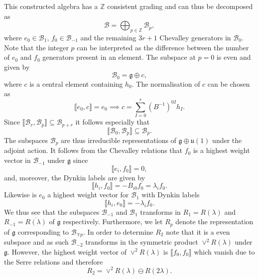 This constructed algebra has a $\mathbb{Z}$ consistent grading and can thus be decomposed as 
\begin{equation}
    \mathscr{B} = \bigoplus_{p\in\mathbb{Z}} \mathscr{B}_p,
\end{equation}
where $e_0\in\mathscr{B}_{1}$, $f_0\in\mathscr{B}_{-1}$ and the remaining $3r+1$ Chevalley generators in $\mathscr{B}_0$. Note that the integer $p$ can be interpreted as the difference between the number of $e_0$ and $f_0$ generators present in an element. The subspace at $p=0$ is even and given by 
\begin{equation}
    \mathscr{B}_0 = \mathfrak{g}\oplus c,
\end{equation}
where $c$ is a central element containing $h_0$. The normalisation of $c$ can be chosen as 
\begin{equation}
    \llbracket e_0,c \rrbracket = e_0 \implies c = \sum_{I=0}^r(B^{-1})^{0I}h_I.
\end{equation}
Since $\llbracket\mathscr{B}_r,\mathscr{B}_p\rrbracket \subseteq \mathscr{B}_{p+r}$ it follows especially that 
\begin{equation}
    \llbracket\mathscr{B}_0,\mathscr{B}_p\rrbracket \subseteq \mathscr{B}_p.
\end{equation}
The subspaces $\mathscr{B}_p$ are thus irreducible representations of $\mathfrak{g}\oplus \mathfrak{u}(1)$ under the adjoint action. It follows from the Chevalley relations that $f_0$ is a highest weight vector in $\mathscr{B}_{-1}$ under $\mathfrak{g}$ since 
\begin{equation}
    \llbracket e_i, f_0\rrbracket = 0,
\end{equation}
and, moreover, the Dynkin labels are given by 
\begin{equation}
    \llbracket h_i,f_0\rrbracket = -B_{i0}f_0 = \lambda_if_0.
\end{equation}
Likewise is $e_0$ a highest weight vector for $\mathscr{B}_1$ with Dynkin labels
\begin{equation}
    \llbracket h_i,e_0\rrbracket = -\lambda_if_0.
\end{equation}
We thus see that the subspaces $\mathscr{B}_{-1}$ and $\mathscr{B}_1$ transforms in $R_1=R(\lambda)$ and $R_{-1}=\overbar{R(\lambda)}$ of $\mathfrak{g}$ respectively. Furthermore, we let $R_{p}$ denote the representation of $\mathfrak{g}$ corresponding to $\mathscr{B}_{\mp p}$. In order to determine $R_2$ note that it is a even subspace and as such $\mathscr{B}_{-2}$ transforms in the symmetric product $\vee^2R(\lambda)$ under $\mathfrak{g}$. However, the highest weight vector of $\vee^2R(\lambda)$ is $\llbracket f_0,f_0\rrbracket$ which vanish due to the Serre relations and therefore 
\begin{equation}
    R_2 = \vee^2R(\lambda)\ominus R(2\lambda).
\end{equation}

